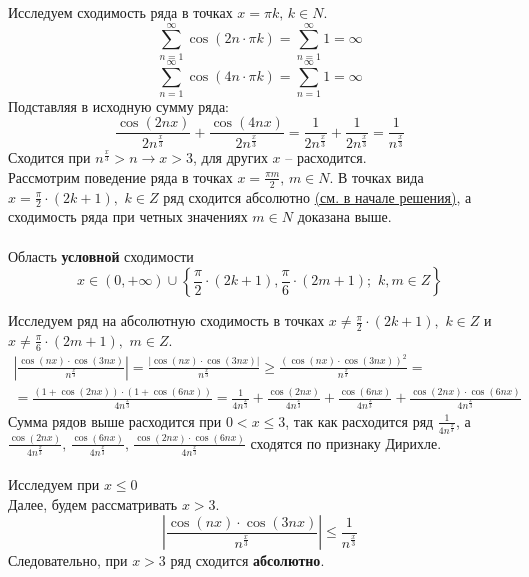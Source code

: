 \documentclass[a5paper, 10pt]{article}
\theoremstyle{definition}
\theoremstyle{plain}
\theoremstyle{remark}
\begin{document}
Исследуем сходимость ряда в точках $x = \pi k, \, k \in N$.
\begin{equation*}
\sum \limits_{n = 1}^{\infty} \cos( 2n\cdot \pi k) = \sum \limits_{n = 1}^{\infty} 1 = \infty
\end{equation*}
\begin{equation*}
\sum \limits_{n = 1}^{\infty} \cos( 4n\cdot \pi k) = \sum \limits_{n = 1}^{\infty} 1 = \infty
\end{equation*}
Подставляя в исходную сумму ряда:
\begin{equation*}
 \frac{\cos( 2nx) }{2n^{\frac{x}{3}}}+\frac{ \cos (4nx) }{2n^{\frac{x}{3}}} = \frac{1 }{2n^{\frac{x}{3}}}+\frac{1 }{2n^{\frac{x}{3}}} = \frac{1 }{n^{\frac{x}{3}}}
\end{equation*}
Сходится при $n^{\frac{x}{3}} > n \to x > 3$, для других $x$ -- расходится.\\

Рассмотрим поведение ряда в точках $x = \frac{\pi m}{2}, \, m \in N$. В точках вида $x = \frac{\pi}{2} \cdot (2k + 1), \,\, k \in  Z$ ряд сходится абсолютно \hyperlink{pdf}{ (см. в начале решения)}, а сходимость ряда при четных значениях $m \in N$ доказана выше.\\\\
Область \textbf{условной} сходимости  $$x \in (0, + \infty)  \cup \left\{  \frac{\pi}{2} \cdot (2k + 1), \frac{\pi}{6} \cdot (2m + 1); \,\, k ,  m\in Z\right\}$$

Исследуем ряд на абсолютную сходимость в точках  $x \neq \frac{\pi}{2} \cdot (2k + 1), \,\, k \in Z$  и $x \neq \frac{\pi}{6} \cdot (2m + 1), \,\, m \in Z$.
\begin{multline*}
\left| \frac{\cos( nx) \cdot \cos (3nx) }{n^{\frac{x}{3}}}  \right| =  \frac{\left|\cos( nx) \cdot \cos (3nx)\right| }{n^{\frac{x}{3}}}
\geq   \frac{\left(\cos( nx) \cdot \cos (3nx)\right)^2 }{n^{\frac{x}{3}}} = \\
= \frac{\left(1 + \cos(2 nx)\right) \cdot \left(1 +  \cos (6nx)\right)}{4n^{\frac{x}{3}}} =
\frac{1}{4n^{\frac{x}{3}}}+\frac{ \cos(2 nx)}{4n^{\frac{x}{3}}}+\frac{\cos (6nx)}{4n^{\frac{x}{3}}}+\frac{\cos(2 nx) \cdot \cos (6nx)}{4n^{\frac{x}{3}}}
\end{multline*}
Сумма рядов выше расходится при $0 <x \leq 3$, так как расходится ряд $\frac{1}{4n^{\frac{x}{3}}}$, а $\frac{ \cos(2 nx)}{4n^{\frac{x}{3}}}, \,\frac{\cos (6nx)}{4n^{\frac{x}{3}}}, \, \frac{\cos(2 nx) \cdot \cos (6nx)}{4n^{\frac{x}{3}}}$  сходятся по признаку Дирихле.\\\\
Исследуем при $x \leq 0$\\
 Далее, будем рассматривать $x > 3$.
\begin{equation*}
\left| \frac{\cos( nx) \cdot \cos (3nx) }{n^{\frac{x}{3}}}  \right| \leq  \frac{1}{n^{\frac{x}{3}}}
\end{equation*}
Следовательно, при $x > 3$ ряд сходится \textbf{абсолютно}.\\
 
\end{document}
